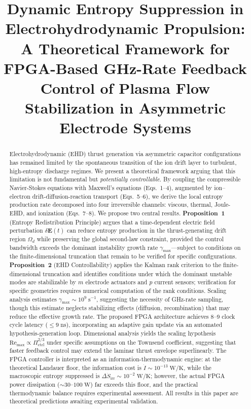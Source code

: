 \documentclass[12pt,twocolumn]{article}
\title{
  \textbf{Dynamic Entropy Suppression in Electrohydrodynamic Propulsion:}\\[4pt]
  \textbf{A Theoretical Framework for FPGA-Based GHz-Rate Feedback}\\[4pt]
  \textbf{Control of Plasma Flow Stabilization in Asymmetric Electrode Systems}
}
\author{
}
\date{}
\newcommand{\ee}{\mathbf{E}}
\newcommand{\Sdot}{\dot{S}_{\mathrm{irr}}}
\newcommand{\Pctrl}{\Pi_{\mathrm{ctrl}}}
\begin{document}
\maketitle

\begin{abstract}
\noindent
Electrohydrodynamic (EHD) thrust generation via asymmetric capacitor
configurations has remained limited by the spontaneous transition of
the ion drift layer to turbulent, high-entropy discharge regimes. We
present a theoretical framework arguing that this limitation is not
fundamental but \emph{potentially controllable}. By coupling the
compressible Navier-Stokes equations with Maxwell's equations
(Eqs.~1--4), augmented by ion--electron drift-diffusion-reaction
transport (Eqs.~5--6), we derive the local entropy production rate
decomposed into four irreversible channels: viscous, thermal,
Joule-EHD, and ionization (Eqs.~7--8). We propose two central
results. \textbf{Proposition~1} (Entropy Redistribution Principle)
argues that a time-dependent electric field perturbation
$\delta\ee(t)$ can reduce entropy production in the thrust-generating
drift region $\Omega_d$ while preserving the global second-law
constraint, provided the control bandwidth exceeds the dominant
instability growth rate $\gamma_{\max}$---subject to conditions on
the finite-dimensional truncation that remain to be verified for
specific configurations. \textbf{Proposition~2} (EHD
Controllability) applies the Kalman rank criterion to the
finite-dimensional truncation and identifies conditions under which
the dominant unstable modes are stabilizable by $m$ electrode
actuators and $p$ current sensors; verification for specific
geometries requires numerical computation of the rank conditions.
Scaling analysis estimates $\gamma_{\max} \sim
10^{9}\;\mathrm{s}^{-1}$, suggesting the necessity of GHz-rate
sampling, though this estimate neglects stabilizing effects
(diffusion, recombination) that may reduce the effective growth rate.
The proposed FPGA architecture achieves 8--9 clock cycle latency
($\leq 9\;\mathrm{ns}$), incorporating an adaptive gain update via
an automated hypothesis-generation loop. Dimensional analysis
yields the scaling hypothesis $\mathrm{Re}_{\max} \propto
\Pctrl^{2/3}$ under specific assumptions on the Townsend
coefficient, suggesting that faster feedback control may extend the
laminar thrust envelope superlinearly. The FPGA controller is
interpreted as an information-thermodynamic engine: at the
theoretical Landauer floor, the information cost is
$\dot{I} \sim 10^{-13}\;\mathrm{W/K}$, while the macroscopic
entropy suppressed is $\Delta\Sdot \sim 10^{-2}\;\mathrm{W/K}$;
however, the actual FPGA power dissipation ($\sim 30$--$100\;
\mathrm{W}$) far exceeds this floor, and the practical
thermodynamic balance requires experimental assessment. All results
in this paper are theoretical predictions awaiting experimental
validation.


\end{abstract}
\end{document}
